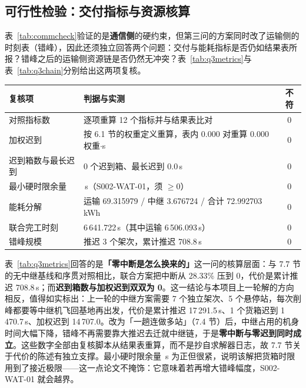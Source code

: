 \subsection{可行性检验：交付指标与资源核算}
\label{sec:feasib-deliv}
\label{sec:occupancy}

表~\ref{tab:commcheck}验证的是\textbf{通信侧}的硬约束，但第三问的方案同时改了运输侧的时刻表（错峰），因此还须独立回答两个问题：交付与能耗指标是否仍如结果表所报？错峰之后的运输侧资源链是否仍然无冲突？表~\ref{tab:q3metrics}与表~\ref{tab:q3chain}分别给出这两项复核。

\begin{center}
\begin{minipage}{\textwidth}
	\label{tab:q3metrics}
	\centering
	\begin{tabularx}{0.98\textwidth}{lXc}
		\toprule
		复核项 & 判据与实测 & 不符 \\
		\midrule
		对照指标数 & 逐项重算 12 个指标并与结果表比对 & 0 \\
		加权迟到 & 按 6.1 节的权重定义重算，表内 0.000 对重算 0.000 权重$\cdot$s & 0 \\
		迟到箱数与最长迟到 & 0 个迟到箱、最长迟到 0.0\,s & 0 \\
		最小硬时限余量 & \mtQthreeMinMarginFine\,s（S002-WAT-01，须 $\ge 0$） & 0 \\
		能耗分解 & 运输 69.315979 / 中继 3.676724 / 合计 72.992703\,kWh & 0 \\
		联合完工时刻 & 6\,641.722\,s（其中运输 6\,506.093\,s） & 0 \\
		错峰规模 & 推迟 3 个架次，累计推迟 708.8\,s & 0 \\
		\bottomrule
	\end{tabularx}
\end{minipage}
\end{center}

表~\ref{tab:q3metrics}回答的是\textbf{「零中断是怎么换来的」}这一问的核算层面：与 7.7 节的无中继基线和序贯对照相比，联合方案把中断从 28.33\% 压到 0，代价是累计推迟 708.8\,s；而\textbf{迟到箱数与加权迟到双双为 0}。这一结论与本项目上一轮解的方向相反，值得如实标出：上一轮的中继方案需要 7 个独立架次、5 个悬停站，每次削峰都要等中继机飞回基地再出发，代价是累计推迟 17\,291.5\,s、1 个货箱迟到 1\,470.7\,s、加权迟到 14\,707.0。改为「一趟连做多站」（7.4 节）后，中继占用的机身时间大幅下降，错峰不再需要靠大推迟去迁就中继链，于是\textbf{零中断与零迟到同时成立}。这些数字全部由复核脚本从结果表重算，而不是抄自求解器日志，故 7.7 节关于代价的陈述有独立支撑。最小硬时限余量 \mtQthreeMinMarginFine\,s 为正但很紧，说明该解把货箱时限用到了接近极限——这一点论文不掩饰：它意味着若再增大错峰幅度，S002-WAT-01 就会越界。

